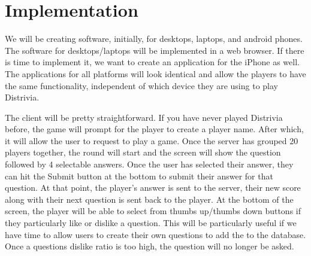 \documentclass{dependencies/acm_proc_article-sp}
\begin{document}
\section{Implementation}
We will be creating software, initially, for desktops, laptops, and android phones.
The software for desktops/laptops will be implemented in a web browser.
If there is time to implement it, we want to create an application for the iPhone as well.
The applications for all platforms will look identical and allow the players to have the same functionality, independent of which device they are using to play Distrivia.

The client will be pretty straightforward.
If you have never played Distrivia before, the game will prompt for the player to create a player name.
After which, it will allow the user to request to play a game.
Once the server has grouped 20 players together, the round will start and the screen will show the question followed by 4 selectable answers.
Once the user has selected their answer, they can hit the Submit button at the bottom to submit their answer for that question.
At that point, the player's answer is sent to the server, their new score along with their next question is sent back to the player.
At the bottom of the screen, the player will be able to select from thumbs up/thumbs down buttons if they particularly like or dislike a question.
This will be particularly useful if we have time to allow users to create their own questions to add the to the database.
Once a questions dislike ratio is too high, the question will no longer be asked.
\end{document}
